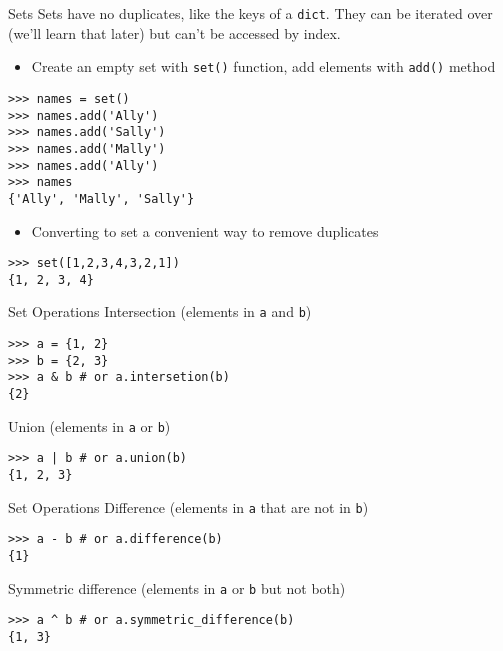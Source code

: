 \documentclass[smaller, aspectratio=1610]{beamer}
\begin{document}
\begin{frame}[label={sec:org3c3fbd3},fragile]{Sets}
 Sets have no duplicates, like the keys of a \texttt{dict}. They can be iterated
over (we'll learn that later) but can't be accessed by index.

\begin{itemize}
\item Create an empty set with \texttt{set()} function, add elements with \texttt{add()} method
\end{itemize}

\lstset{language=Python,label= ,caption= ,captionpos=b,numbers=none}
\begin{lstlisting}
>>> names = set()
>>> names.add('Ally')
>>> names.add('Sally')
>>> names.add('Mally')
>>> names.add('Ally')
>>> names
{'Ally', 'Mally', 'Sally'}
\end{lstlisting}

\begin{itemize}
\item Converting to set a convenient way to remove duplicates
\end{itemize}

\lstset{language=Python,label= ,caption= ,captionpos=b,numbers=none}
\begin{lstlisting}
>>> set([1,2,3,4,3,2,1])
{1, 2, 3, 4}
\end{lstlisting}
\end{frame}

\begin{frame}[label={sec:org8796c76},fragile]{Set Operations}
 Intersection (elements in \texttt{a} \alert{and} \texttt{b})

\lstset{language=Python,label= ,caption= ,captionpos=b,numbers=none}
\begin{lstlisting}
>>> a = {1, 2}
>>> b = {2, 3}
>>> a & b # or a.intersetion(b)
{2}
\end{lstlisting}

Union (elements in \texttt{a} \alert{or} \texttt{b})

\lstset{language=Python,label= ,caption= ,captionpos=b,numbers=none}
\begin{lstlisting}
>>> a | b # or a.union(b)
{1, 2, 3}
\end{lstlisting}
\end{frame}

\begin{frame}[label={sec:org099ab60},fragile]{Set Operations}
 Difference (elements in \texttt{a} that are not in \texttt{b})

\lstset{language=Python,label= ,caption= ,captionpos=b,numbers=none}
\begin{lstlisting}
>>> a - b # or a.difference(b)
{1}
\end{lstlisting}

Symmetric difference (elements in \texttt{a} or \texttt{b} but not both)

\lstset{language=Python,label= ,caption= ,captionpos=b,numbers=none}
\begin{lstlisting}
>>> a ^ b # or a.symmetric_difference(b)
{1, 3}
\end{lstlisting}
\end{frame}
\end{document}
